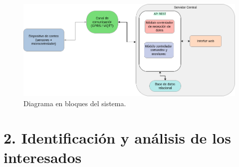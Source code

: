 \documentclass[
11pt, %
]{charter}
\begin{document}
\begin{figure}[htpb]
\centering 
\includegraphics[width=.90\textwidth]{./Figuras/diagBloques.png}
\caption{Diagrama en bloques del sistema.}
\label{fig:diagBloques}
\end{figure}

\vspace{25px}


\section{2. Identificación y análisis de los interesados}
\label{sec:interesados}
\end{document}
